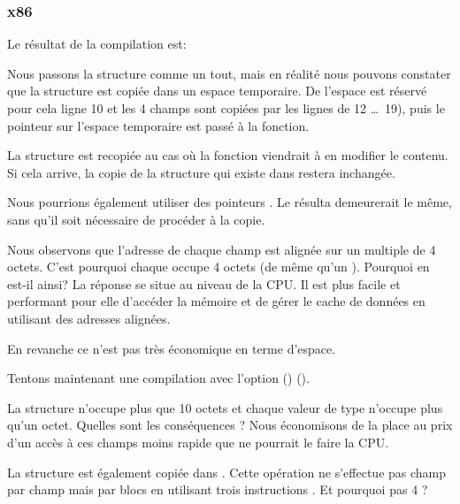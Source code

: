 ﻿\subsubsection{x86}

Le résultat de la compilation est:



Nous passons la structure comme un tout, mais en réalité nous pouvons constater que la structure est copiée 
dans un espace temporaire. De l'espace est réservé pour cela ligne 10 et les 4 champs sont copiées par les 
lignes de 12 \ldots\ 19), puis le pointeur sur l'espace temporaire est passé à la fonction.

La structure est recopiée au cas où la fonction \ttf{} viendrait à en modifier le contenu. Si cela arrive, 
la copie de la structure qui existe dans \main restera inchangée.

Nous pourrions également utiliser des pointeurs \CCpp. Le résulta demeurerait le même, sans qu'il soit 
nécessaire de procéder à la copie.

Nous observons que l'adresse de chaque champ est alignée sur un multiple de 4  octets. C'est pourquoi chaque 
\Tchar occupe 4 octets (de même qu'un \Tint). Pourquoi en est-il ainsi? La réponse se situe au niveau de la 
CPU. Il est plus facile et performant pour elle d'accéder la mémoire et de gérer le cache de données en 
utilisant des adresses alignées.

En revanche ce n'est pas très économique en terme d'espace.

Tentons maintenant une compilation avec l'option () ().



La structure n'occupe plus que 10 octets et chaque valeur de type \Tchar n'occupe plus qu'un octet. Quelles 
sont les conséquences ? Nous économisons de la place au prix d'un accès à ces champs moins rapide que ne 
pourrait le faire la CPU.

\label{short_struct_copying_using_MOV}

La structure est également copiée dans \main. Cette opération ne s'effectue pas champ par champ mais par 
blocs en utilisant trois instructions \MOV. Et pourquoi pas 4 ?

